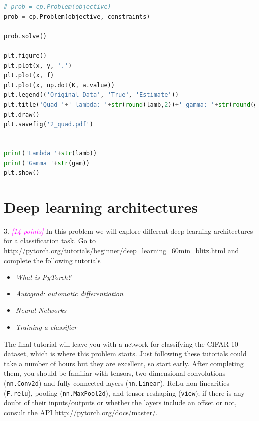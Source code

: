 \documentclass{article}
\newcommand{\1}{\mathbf{1}}
\newcommand{\grade}[1]{\small\textcolor{magenta}{\emph{[#1 points]}} \normalsize}
\begin{document}
\begin{lstlisting}[language=Python]
# prob = cp.Problem(objective)
prob = cp.Problem(objective, constraints)

prob.solve()

plt.figure()
plt.plot(x, y, '.')
plt.plot(x, f)
plt.plot(x, np.dot(K, a.value))
plt.legend(('Original Data', 'True', 'Estimate'))
plt.title('Quad '+' lambda: '+str(round(lamb,2))+' gamma: '+str(round(gam,2)))#lambda1: '+str(round(lamb2,2))
plt.draw()
plt.savefig('2_quad.pdf')


print('Lambda '+str(lamb))
print('Gamma '+str(gam))
plt.show()

\end{lstlisting}

\section*{Deep learning architectures}

3. \grade{14} In this problem we will explore different deep learning architectures for a classification task. 
Go to \url{http://pytorch.org/tutorials/beginner/deep_learning_60min_blitz.html} and complete the following tutorials\\[-18pt]
\begin{itemize}
  \item \emph{What is PyTorch?}\\[-18pt]
  \item \emph{Autograd: automatic differentiation}\\[-18pt]
  \item \emph{Neural Networks}\\[-18pt]
  \item \emph{Training a classifier}\\[-18pt]
\end{itemize}
The final tutorial will leave you with a network for classifying the CIFAR-10 dataset, which is where this problem starts. 
Just following these tutorials could take a number of hours but they are excellent, so start early. 
After completing them, you should be familiar with tensors, two-dimensional convolutions (\texttt{nn.Conv2d}) and fully connected layers (\texttt{nn.Linear}), ReLu non-linearities (\texttt{F.relu}), pooling (\texttt{nn.MaxPool2d}), and tensor reshaping (\texttt{view}); if there is any doubt of their inputs/outputs or whether the layers include an offset or not, consult the API \url{http://pytorch.org/docs/master/}. \\
\end{document}
